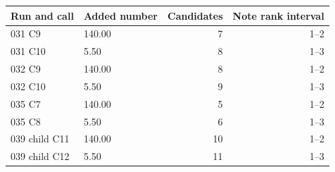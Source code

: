 \begin{tabular}{@{}llrr@{}}
\toprule
Run and call & Added number & Candidates & Note rank interval \\
\midrule
031 C9 & 140.00 & 7 & 1--2 \\
031 C10 & 5.50 & 8 & 1--3 \\
032 C9 & 140.00 & 8 & 1--2 \\
032 C10 & 5.50 & 9 & 1--3 \\
035 C7 & 140.00 & 5 & 1--2 \\
035 C8 & 5.50 & 6 & 1--3 \\
039 child C11 & 140.00 & 10 & 1--2 \\
039 child C12 & 5.50 & 11 & 1--3 \\
\bottomrule
\end{tabular}
